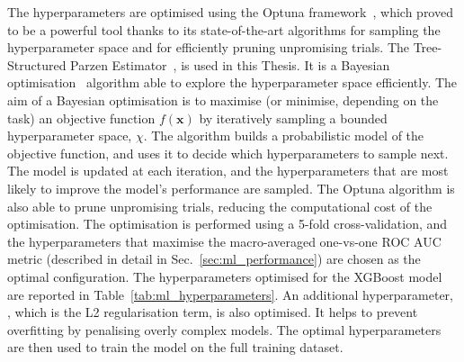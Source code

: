 The hyperparameters are optimised using the Optuna framework~\cite{akiba2019optuna}, which proved to be a powerful tool thanks to its state-of-the-art algorithms for sampling the hyperparameter space and for efficiently pruning unpromising trials. The Tree-Structured Parzen Estimator~\cite{bergstra2011algorithms}, is used in this Thesis. It is a Bayesian optimisation~\cite{frazier2018tutorial,snoek2012practical} algorithm able to explore the hyperparameter space efficiently. The aim of a Bayesian optimisation is to maximise (or minimise, depending on the task) an objective function $f(\mathbf{x})$ by iteratively sampling a bounded hyperparameter space, $\chi$. The algorithm builds a probabilistic model of the objective function, and uses it to decide which hyperparameters to sample next. The model is updated at each iteration, and the hyperparameters that are most likely to improve the model's performance are sampled. The Optuna algorithm is also able to prune unpromising trials, reducing the computational cost of the optimisation. The optimisation is performed using a 5-fold cross-validation, and the hyperparameters that maximise the macro-averaged one-vs-one ROC AUC metric (described in detail in Sec.~\ref{sec:ml_performance}) are chosen as the optimal configuration. The hyperparameters optimised for the XGBoost model are reported in Table~\ref{tab:ml_hyperparameters}. An additional hyperparameter, , which is the L2 regularisation term, is also optimised. It helps to prevent overfitting by penalising overly complex models. The optimal hyperparameters are then used to train the model on the full training dataset.

